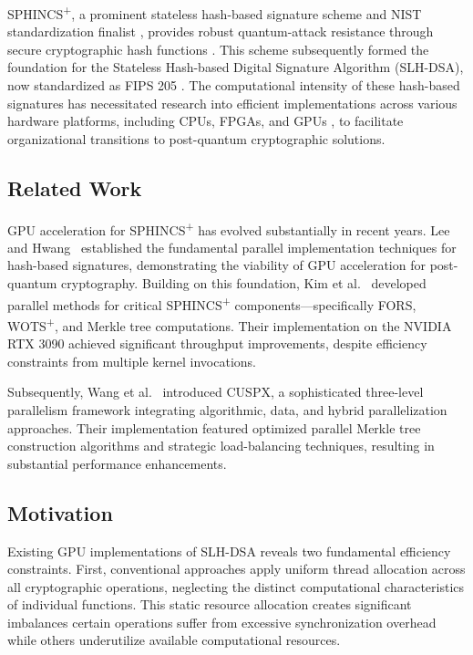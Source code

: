 \documentclass[journal]{IEEEtran}
\begin{document}
SPHINCS\textsuperscript{+}, a prominent stateless hash-based signature scheme and NIST standardization finalist \cite{Turan}, provides robust quantum-attack resistance through secure cryptographic hash functions \cite{Bernstein2019}. This scheme subsequently formed the foundation for the Stateless Hash-based Digital Signature Algorithm (SLH-DSA), now standardized as FIPS 205 \cite{FIPS205}. The computational intensity of these hash-based signatures has necessitated research into efficient implementations across various hardware platforms, including CPUs, FPGAs, and GPUs \cite{Joseph2022}, to facilitate organizational transitions to post-quantum cryptographic solutions.

\subsection{Related Work}

GPU acceleration for SPHINCS\textsuperscript{+} has evolved substantially in recent years. Lee and Hwang~\cite{Lee2022} established the fundamental parallel implementation techniques for hash-based signatures, demonstrating the viability of GPU acceleration for post-quantum cryptography. Building on this foundation, Kim et al.~\cite{Kim2024} developed parallel methods for critical SPHINCS\textsuperscript{+} components—specifically FORS, WOTS\textsuperscript{+}, and Merkle tree computations. Their implementation on the NVIDIA RTX 3090 achieved significant throughput improvements, despite efficiency constraints from multiple kernel invocations.

Subsequently, Wang et al.~\cite{Wang2025} introduced CUSPX, a sophisticated three-level parallelism framework integrating algorithmic, data, and hybrid parallelization approaches. Their implementation featured optimized parallel Merkle tree construction algorithms and strategic load-balancing techniques, resulting in substantial performance enhancements.

\subsection{Motivation}

Existing GPU implementations of SLH-DSA reveals two fundamental efficiency constraints.
First, conventional approaches apply uniform thread allocation across all cryptographic operations, neglecting the distinct computational characteristics of individual functions. This static resource allocation creates significant imbalances certain operations suffer from excessive synchronization overhead while others underutilize available computational resources.
\end{document}
